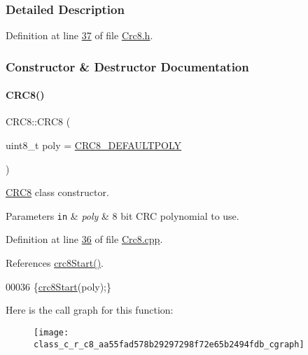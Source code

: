 \subsubsection{Detailed Description}


Definition at line \mbox{\hyperlink{_crc8_8h_source_l00037}{37}} of file \mbox{\hyperlink{_crc8_8h_source}{Crc8.\+h}}.



\subsubsection{Constructor \& Destructor Documentation}
\mbox{\label{class_c_r_c8_aa55fad578b29297298f72e65b2494fdb}} 
\paragraph{\texorpdfstring{C\+R\+C8()}{CRC8()}}
{\footnotesize\ttfamily C\+R\+C8\+::\+C\+R\+C8 (\begin{DoxyParamCaption}\item[{uint8\+\_\+t}]{poly = {\ttfamily \mbox{\hyperlink{_crc8_8h_a723f9adea4dfa42b246b0d248e57a794}{C\+R\+C8\+\_\+\+D\+E\+F\+A\+U\+L\+T\+P\+O\+LY}}} }\end{DoxyParamCaption})}



\mbox{\hyperlink{class_c_r_c8}{C\+R\+C8}} class constructor. 


\begin{DoxyParams}[1]{Parameters}
\mbox{\tt in}  & {\em poly} & 8 bit C\+RC polynomial to use. \\
\hline
\end{DoxyParams}


Definition at line \mbox{\hyperlink{_crc8_8cpp_source_l00036}{36}} of file \mbox{\hyperlink{_crc8_8cpp_source}{Crc8.\+cpp}}.



References \mbox{\hyperlink{_crc8_8cpp_source_l00061}{crc8\+Start()}}.


\begin{DoxyCode}
00036 \{\mbox{\hyperlink{class_c_r_c8_a38931d0b9e5ba8f2e974dca7dbf30e5a}{crc8Start}}(poly);\}
\end{DoxyCode}
Here is the call graph for this function\+:\nopagebreak
\begin{figure}[H]
\begin{center}
\leavevmode
\texttt{[image: class\_c\_r\_c8\_aa55fad578b29297298f72e65b2494fdb\_cgraph]}
\end{center}
\end{figure}


